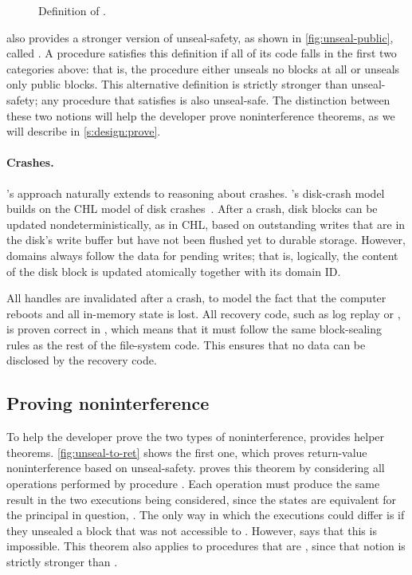 \begin{figure}[ht]
  
  \caption{Definition of .}
  \label{fig:unseal-public}
\end{figure}

\sys also provides a stronger version of unseal-safety, as shown in
\autoref{fig:unseal-public}, called .  A procedure
satisfies this definition if all of its code falls in the first two
categories above: that is, the procedure either unseals no blocks
at all or unseals only public blocks.  This alternative definition is
strictly stronger than unseal-safety; any procedure that satisfies
 is also unseal-safe.  The distinction between these
two notions will help the developer prove noninterference theorems,
as we will describe in \autoref{s:design:prove}.

\paragraph{Crashes.}

\sys's approach naturally extends to reasoning about crashes.
\sys's disk-crash model builds on the CHL model of disk
crashes~\cite{chen:fscq, chen:dfscq}.  After a crash, disk blocks can
be updated nondeterministically, as in CHL, based on outstanding writes
that are in the disk's write buffer but have not been flushed yet to
durable storage.  However, domains always follow the
data for pending writes; that is, logically, the content of the disk
block is updated atomically together with its domain ID\@.

All handles are invalidated after a crash, to model the fact that the
computer reboots and all in-memory state is lost.  All recovery code,
such as log replay or , is proven correct in \sys, which means
that it must follow the same block-sealing rules as the rest of the
file-system code.  This ensures that no data can be disclosed by the
recovery code.


\subsection{Proving noninterference}
\label{s:design:prove}

To help the developer prove the two types of noninterference, \sys
provides helper theorems.  \autoref{fig:unseal-to-ret} shows the first
one, which proves return-value noninterference based on unseal-safety.
\sys proves this theorem by considering all operations performed by
procedure .  Each operation must produce the same result in the
two executions being considered, since the states are equivalent for the
principal in question, .  The only way in which the executions
could differ is if they unsealed a block that was not accessible
to .  However,  says that this is impossible.
This theorem also applies to procedures that are ,
since that notion is strictly stronger than .

